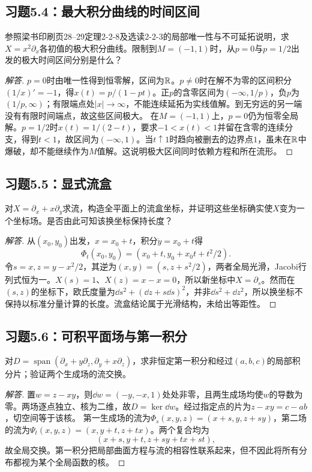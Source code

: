 \subsection*{习题5.4：最大积分曲线的时间区间}
参照梁书印刷页28--29定理2-2-8及选读2-2-3的局部唯一性与不可延拓说明，求$X=x^2\partial_x$各初值的极大积分曲线。限制到$M=(-1,1)$时，从$p=0$与$p=1/2$出发的极大时间区间分别是什么？
\begin{proof}[解答]
$p=0$时由唯一性得到恒零解，区间为$\mathbb{R}$。$p\ne0$时在解不为零的区间积分$(1/x)'=-1$，得$x(t)=p/(1-pt)$。正$p$的含零区间为$(-\infty,1/p)$，负$p$为$(1/p,\infty)$；有限端点处$|x|\to\infty$，不能连续延拓为实线值解。到无穷远的另一端没有有限时间端点，故这些区间极大。
在$M=(-1,1)$上，$p=0$仍为恒零全局解。$p=1/2$时$x(t)=1/(2-t)$，要求$-1<x(t)<1$并留在含零的连续分支，得到$t<1$，故区间为$(-\infty,1)$。当$t\uparrow1$时趋向被删去的边界点$1$，虽未在$\mathbb{R}$中爆破，却不能继续作为$M$值解。这说明极大区间同时依赖方程和所在流形。
\end{proof}

\subsection*{习题5.5：显式流盒}
对$X=\partial_x+x\partial_y$求流，构造全平面上的流盒坐标，并证明这些坐标确实使$X$变为一个坐标场。是否由此可知该换坐标保持长度？
\begin{proof}[解答]
从$(x_0,y_0)$出发，$x=x_0+t$，积分$\dot y=x_0+t$得
\[
 \Phi_t(x_0,y_0)=(x_0+t,y_0+x_0t+t^2/2).
\]
令$s=x,z=y-x^2/2$，其逆为$(x,y)=(s,z+s^2/2)$，两者全局光滑，Jacobi行列式恒为一。$X(s)=1$、$X(z)=x-x=0$，所以新坐标中$X=\partial_s$。然而在$(s,z)$的坐标下，欧氏度量为$\dd s^2+(\dd z+s\dd s)^2$，并非$\dd s^2+\dd z^2$，所以换坐标不保持以标准分量计算的长度。流盒结论属于光滑结构，未给出等距性。
\end{proof}

\subsection*{习题5.6：可积平面场与第一积分}
对$D=\operatorname{span}(\partial_x+y\partial_z,\partial_y+x\partial_z)$，求非恒定第一积分和经过$(a,b,c)$的局部积分片；验证两个生成场的流交换。
\begin{proof}[解答]
置$w=z-xy$，则$\dd w=(-y,-x,1)$处处非零，且两生成场均使$w$的导数为零。两场逐点独立、核为二维，故$D=\ker\dd w$。经过指定点的片为$z-xy=c-ab$，切空间等于该核。
第一生成场的流为$\Phi_s(x,y,z)=(x+s,y,z+sy)$，第二场的流为$\Psi_t(x,y,z)=(x,y+t,z+tx)$。两个复合均为
\[
 (x+s,y+t,z+sy+tx+st),
\]
故全局交换。第一积分把局部曲面方程与流的相容性联系起来，但不因此将所有分布都视为某个全局函数的核。
\end{proof}

